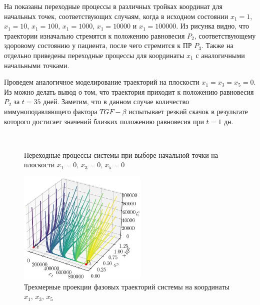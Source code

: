 \documentclass[14pt,a4paper]{extarticle}
\begin{document}
\begin{example}
		На  показаны переходные процессы в различных тройках координат для начальных точек, соответствующих случаям, когда в исходном состоянии $x_1=1$, $x_1=10$, $x_1=100$, $x_1=1000$, $x_1=10000$ и $x_1=100000$. Из рисунка видно, что траектории изначально стремятся к положению равновесия $P_2$, соответствующему здоровому состоянию у пациента, после чего стремится к ПР $P_3$. Также на  отдельно приведены переходные процессы для координаты $x_1$ с аналогичными начальными точками.
		
		Проведем аналогичное моделирование траекторий на плоскости $x_1=x_3=x_5=0$. Из  можно делать вывод о том, что траектория приходит к положению равновесия $P_2$ за $t=35$ дней. Заметим, что в данном случае количество иммуноподавляющего фактора $TGF-\beta$ испытывает резкий скачок в результате которого достигает значений близких положению равновесия при $t=1$ дн. 	
		\newpage
		\begin{figure}[h]
			\centering
			\\
			\caption{Переходные процессы системы при выборе начальной точки на плоскости $x_1=0,\, x_3=0,\, x_5=0$}
			\label{fig:on_D_border}
		\end{figure}
		\begin{figure}[h]
			\centering
			\includegraphics[width=0.55\textwidth]{media/Figure_12.png}
			\caption{Трехмерные проекции фазовых траекторий системы на координаты $x_1,\, x_3,\, x_5$}
			\label{fig:model_K5}
		\end{figure}
		

\end{example}
\end{document}

